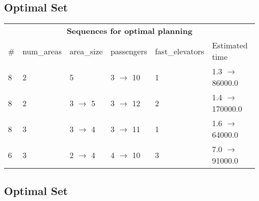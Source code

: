 \documentclass{article}
\begin{document}
                            \subsection*{Optimal Set}

                            \begin{center}
                            \begin{tabular}{@{}l|l|l|l|l|l@{}}
                            \multicolumn{6}{c}{\bf \large Sequences for optimal planning}\\
                            \# & num\_areas & area\_size & passengers & fast\_elevators & Estimated time\\\midrule
                            8&2&5&3 $\rightarrow$ 10&1&1.3 $\rightarrow$ 86000.0\\
8&2&3 $\rightarrow$ 5&3 $\rightarrow$ 12&2&1.4 $\rightarrow$ 170000.0\\
8&3&3 $\rightarrow$ 4&3 $\rightarrow$ 11&1&1.6 $\rightarrow$ 64000.0\\
6&3&2 $\rightarrow$ 4&4 $\rightarrow$ 10&3&7.0 $\rightarrow$ 91000.0
                            \end{tabular}
                            \end{center}
                    
                                \subsection*{Optimal Set}
                                
\end{document}
